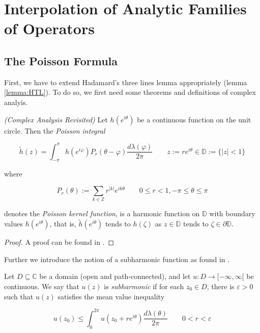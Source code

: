 \section{Interpolation of Analytic Families of Operators}
\subsection{The Poisson Formula}
First, we have to extend Hadamard's three lines lemma appropriately (lemma \ref{lemma:HTL}). To do so, we first need some theorems and definitions of complex analyis.

\begin{mdframed}
	\begin{theorem}\emph{(Complex Analysis Revisited)}
		Let $h(e^{i\theta})$ be a continuous function on the unit circle. Then the \emph{Poisson integral} 

		\begin{equation*}
			\tilde{h}\left( z \right) = \int_{-\pi}^{\pi} h\left( e^{i\varphi} \right) P_r\left( \theta - \varphi \right)\frac{d \lambda(\varphi)}{2\pi} \qquad z := re^{i\theta} \in \mathbb{D} := \{\vert z \vert < 1\}	
		\end{equation*}

		where 

		\begin{equation}
			P_r(\theta) := \sum\limits_{k \in \mathbb{Z}} r^{\vert k \vert} e^{ik\theta} \qquad 0 \leqslant r < 1, -\pi \leqslant \theta \leqslant \pi
		\end{equation}

		denotes the \emph{Poisson kernel function}, is a harmonic function on $\mathbb{D}$ with boundary values $h\left( e^{i\theta} \right)$, that is, $\tilde{h}\left( e^{i\theta} \right)$ tends to $h\left( \zeta \right)$ as $z \in \mathbb{D}$ tends to $\zeta \in \partial\mathbb{D}$.
		\label{thm:poisson}
	\end{theorem}
\end{mdframed}

\begin{proof}
	A proof can be found in \cite[277--278]{gamelin:complex_analysis:2001}.	
\end{proof}

Further we introduce the notion of a subharmonic function as found in \cite[394]{gamelin:complex_analysis:2001}.

\vspace{2mm}

\begin{mdframed}
	\begin{definition}
		Let $D \subseteq \mathbb{C}$ be a domain (open and path-connected), and let $u: D \rightarrow [-\infty,\infty[$ be continuous. We say that $u(z)$ is \emph{subharmonic} if for each $z_0 \in D$, there is $\varepsilon > 0$ such that $u(z)$ satisfies the mean value inequality

			\begin{equation}
				u(z_0) \leqslant \int_0^{2\pi} u\left( z_0 + re^{i\theta} \right) \frac{d\lambda(\theta)}{2\pi} \qquad 0 < r < \varepsilon
			\end{equation}
	\end{definition}
\end{mdframed}

